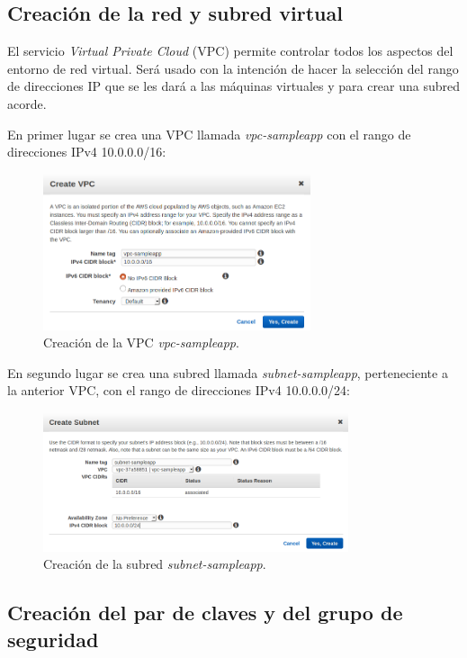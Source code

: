 \subsection{Creación de la red y subred virtual}

El servicio \textit{Virtual Private Cloud} (VPC) permite controlar todos los aspectos del entorno de red virtual. Será usado con la intención de hacer la selección del rango de direcciones IP que se les dará a las máquinas virtuales y para crear una subred acorde.

En primer lugar se crea una VPC llamada \textit{vpc-sampleapp} con el rango de direcciones IPv4 10.0.0.0/16:

\begin{figure}[H]
\centering
\includegraphics[width=0.7\textwidth]{images/figures/vpc-sampleapp.png}
\caption{Creación de la VPC \textit{vpc-sampleapp}.}
\end{figure}

En segundo lugar se crea una subred llamada \textit{subnet-sampleapp}, perteneciente a la anterior VPC, con el rango de direcciones IPv4 10.0.0.0/24:

\begin{figure}[H]
\centering
\includegraphics[width=0.8\textwidth]{images/figures/subnet-sampleapp.png}
\caption{Creación de la subred \textit{subnet-sampleapp}.}
\end{figure}

\subsection{Creación del par de claves y del grupo de seguridad}

